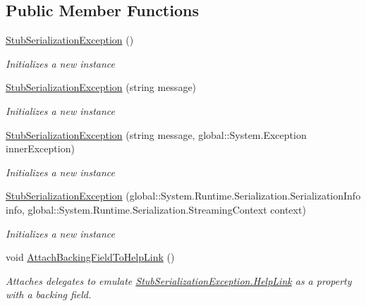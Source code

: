 \subsection*{Public Member Functions}
\begin{DoxyCompactItemize}
\item 
\hyperlink{class_system_1_1_runtime_1_1_serialization_1_1_fakes_1_1_stub_serialization_exception_a703b3e3dca62e60c4c991f28a7f709b6}{Stub\-Serialization\-Exception} ()
\begin{DoxyCompactList}\small\item\em Initializes a new instance\end{DoxyCompactList}\item 
\hyperlink{class_system_1_1_runtime_1_1_serialization_1_1_fakes_1_1_stub_serialization_exception_a21fad4b25683574fe8ce880df022b227}{Stub\-Serialization\-Exception} (string message)
\begin{DoxyCompactList}\small\item\em Initializes a new instance\end{DoxyCompactList}\item 
\hyperlink{class_system_1_1_runtime_1_1_serialization_1_1_fakes_1_1_stub_serialization_exception_a912b03ba76ae64a7d46b3713f16ba80c}{Stub\-Serialization\-Exception} (string message, global\-::\-System.\-Exception inner\-Exception)
\begin{DoxyCompactList}\small\item\em Initializes a new instance\end{DoxyCompactList}\item 
\hyperlink{class_system_1_1_runtime_1_1_serialization_1_1_fakes_1_1_stub_serialization_exception_a0e31f59c43261b761ee3e597256afbe2}{Stub\-Serialization\-Exception} (global\-::\-System.\-Runtime.\-Serialization.\-Serialization\-Info info, global\-::\-System.\-Runtime.\-Serialization.\-Streaming\-Context context)
\begin{DoxyCompactList}\small\item\em Initializes a new instance\end{DoxyCompactList}\item 
void \hyperlink{class_system_1_1_runtime_1_1_serialization_1_1_fakes_1_1_stub_serialization_exception_ab550d4438aad8744fd14dc8dd40c4ca8}{Attach\-Backing\-Field\-To\-Help\-Link} ()
\begin{DoxyCompactList}\small\item\em Attaches delegates to emulate \hyperlink{class_system_1_1_runtime_1_1_serialization_1_1_fakes_1_1_stub_serialization_exception_aa4e604a41b86c50951b7cdf4853132fb}{Stub\-Serialization\-Exception.\-Help\-Link} as a property with a backing field.\end{DoxyCompactList}\item 

\end{DoxyCompactItemize}
